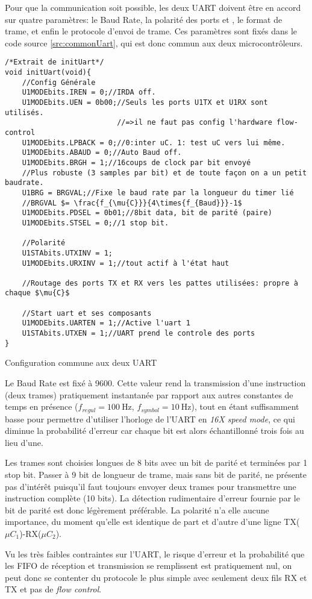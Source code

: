 Pour que la communication soit possible, les deux UART doivent être en accord sur quatre paramètres: le Baud Rate, la polarité des ports  et , le format de trame, et enfin le protocole d'envoi de trame. Ces paramètres sont fixés dans le code source \ref{src:commonUart}, qui est donc commun aux deux microcontrôleurs.
\begin{listing}[htbp]
\begin{verbatim}
/*Extrait de initUart*/
void initUart(void){
    //Config Générale
    U1MODEbits.IREN = 0;//IRDA off.
    U1MODEbits.UEN = 0b00;//Seuls les ports U1TX et U1RX sont utilisés.
                          //=>il ne faut pas config l'hardware flow-control
    U1MODEbits.LPBACK = 0;//0:inter uC. 1: test uC vers lui même.
    U1MODEbits.ABAUD = 0;//Auto Baud off.
    U1MODEbits.BRGH = 1;//16coups de clock par bit envoyé
    //Plus robuste (3 samples par bit) et de toute façon on a un petit baudrate.
    U1BRG = BRGVAL;//Fixe le baud rate par la longueur du timer lié
    //BRGVAL $= \frac{f_{\mu{C}}}{4\times{f_{Baud}}}-1$
    U1MODEbits.PDSEL = 0b01;//8bit data, bit de parité (paire)
    U1MODEbits.STSEL = 0;//1 stop bit.

    //Polarité
    U1STAbits.UTXINV = 1;
    U1MODEbits.URXINV = 1;//tout actif à l'état haut

    //Routage des ports TX et RX vers les pattes utilisées: propre à chaque $\mu{C}$

    //Start uart et ses composants
    U1MODEbits.UARTEN = 1;//Active l'uart 1
    U1STAbits.UTXEN = 1;//UART prend le controle des ports
}
\end{verbatim}
\caption{Configuration commune aux deux UART\label{src:commonUart}}
\end{listing}

Le Baud Rate est fixé à \num{9600}. Cette valeur rend la transmission d'une instruction (deux trames) pratiquement instantanée par rapport aux autres constantes de temps en présence ($f_{regul} = \SI{100}{\hertz}$, $f_{symbol} = \SI{10}{\hertz}$), tout en étant suffisamment basse pour permettre d'utiliser l'horloge de l'UART en \emph{16X speed mode}, ce qui diminue la probabilité d'erreur car chaque bit est alors échantillonné trois fois au lieu d'une.

Les trames sont choisies longues de 8 bits avec un bit de parité et terminées par 1 stop bit. Passer à 9 bit de longueur de trame, mais sans bit de parité, ne présente pas d'intérêt puisqu'il faut toujours envoyer deux trames pour transmettre une instruction complète (10 bits). La détection rudimentaire d'erreur fournie par le bit de parité est donc légèrement préférable. La polarité n'a elle aucune importance, du moment qu'elle est identique de part et d'autre d'une ligne TX($\mu C_1$)-RX($\mu C_2$).

Vu les très faibles contraintes sur l'UART, le risque d'erreur et la probabilité que les FIFO de réception et transmission se remplissent est pratiquement nul, on peut donc se contenter du protocole le plus simple avec seulement deux fils RX et TX et pas de \emph{flow control}.
